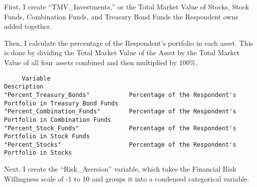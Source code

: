 \documentclass[
]{article}
\newenvironment{Shaded}{\begin{snugshade}}{\end{snugshade}}
\newcommand{\DataTypeTok}[1]{\textcolor[rgb]{0.13,0.29,0.53}{#1}}
\newcommand{\DecValTok}[1]{\textcolor[rgb]{0.00,0.00,0.81}{#1}}
\newcommand{\KeywordTok}[1]{\textcolor[rgb]{0.13,0.29,0.53}{\textbf{#1}}}
\newcommand{\NormalTok}[1]{#1}
\newcommand{\OperatorTok}[1]{\textcolor[rgb]{0.81,0.36,0.00}{\textbf{#1}}}
\newcommand{\StringTok}[1]{\textcolor[rgb]{0.31,0.60,0.02}{#1}}
\begin{document}
First, I create ``TMV\_Investments,'' or the Total Market Value of
Stocks, Stock Funds, Combination Funds, and Treasury Bond Funds the
Respondent owns added together.

Then, I calculate the percentage of the Respondent's portfolio in each
asset. This is done by dividing the Total Market Value of the Asset by
the Total Market Value of all four assets combined and then multiplied
by 100\%.

\begin{verbatim}
     Variable                                               Description
"Percent_Treasury_Bonds"           Percentage of the Respondent's Portfolio in Treasury Bond Funds
"Percent_Combination_Funds"        Percentage of the Respondent's Portfolio in Combination Funds
"Percent_Stock_Funds"              Percentage of the Respondent's Portfolio in Stock Funds
"Percent_Stocks"                   Percentage of the Respondent's Portfolio in Stocks
\end{verbatim}

\begin{Shaded}
\end{Shaded}

Next, I create the ``Risk\_Aversion'' variable, which takes the
Financial Risk Willingness scale of -1 to 10 and groups it into a
condensed categorical variable.
\end{document}
